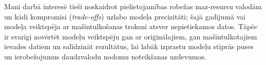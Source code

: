 Mani darbā interesē tieši noskaidrot pielietojamības robežas maz-resursu valodām un kādi kompromisi (\textit{trade-offs}) uzlabo modeļa precizitāti; šajā gadījumā vai modeļa veiktspēja ar mašīntulkošanas troksni atsver nepietiekamos datos. Tāpēc ir svarīgi novērtēt modeļu veiktspēju gan ar oriģinālajiem, gan mašīntulkotajiem ievades datiem un salīdzināt rezultātus, lai labāk izprastu modeļu stiprās puses un ierobežojumus daudzvalodu nodomu noteikšanas uzdevumos.









